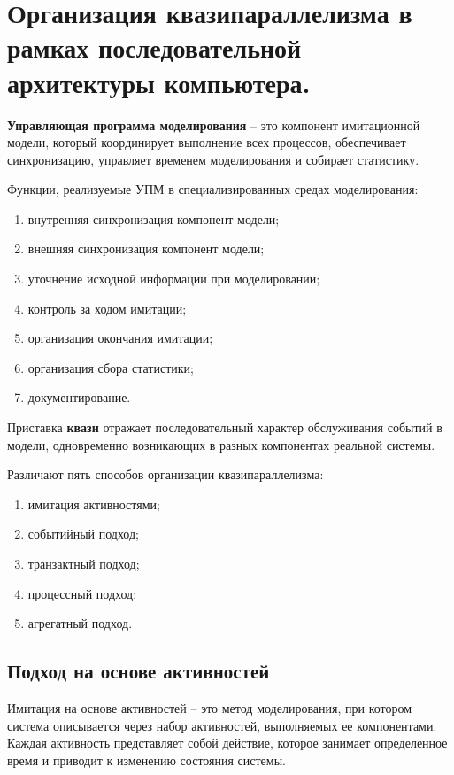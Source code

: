 \section{Организация квазипараллелизма в рамках последовательной архитектуры компьютера.}

\textbf{Управляющая программа моделирования} -- это компонент имитационной
модели, который координирует выполнение всех процессов, обеспечивает
синхронизацию, управляет временем моделирования и собирает статистику.

Функции, реализуемые УПМ в специализированных средах моделирования:
\begin{enumerate}
  \item внутренняя синхронизация компонент модели;
  \item внешняя синхронизация компонент модели;
  \item уточнение исходной информации при моделировании;
  \item контроль за ходом имитации;
  \item организация окончания имитации;
  \item организация сбора статистики;
  \item документирование.
\end{enumerate}

Приставка \textbf{квази} отражает последовательный характер обслуживания
событий в модели, одновременно возникающих в разных компонентах реальной
системы.

Различают пять способов организации квазипараллелизма:
\begin{enumerate}
  \item имитация активностями;
  \item событийный подход;
  \item транзактный подход;
  \item процессный подход;
  \item агрегатный подход.
\end{enumerate}

\subsection*{Подход на основе активностей}

Имитация на основе активностей -- это метод моделирования, при котором
система описывается через набор активностей, выполняемых ее компонентами.
Каждая активность представляет собой действие, которое занимает определенное
время и приводит к изменению состояния системы.

